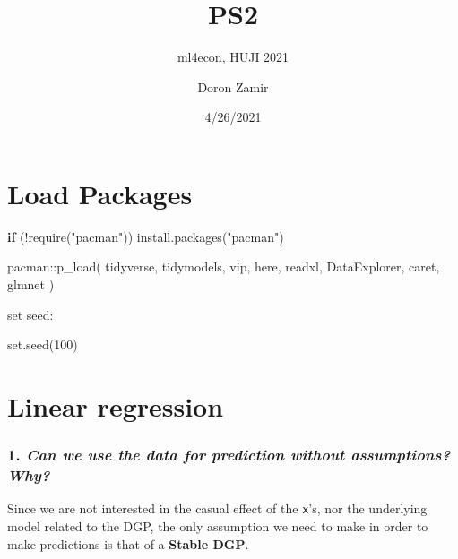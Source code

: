 \documentclass[
]{article}
\title{PS2}
\subtitle{ml4econ, HUJI 2021}
\author{Doron Zamir}
\date{4/26/2021}
\newenvironment{Shaded}{\begin{snugshade}}{\end{snugshade}}
\newcommand{\ControlFlowTok}[1]{\textcolor[rgb]{0.13,0.29,0.53}{\textbf{#1}}}
\newcommand{\DecValTok}[1]{\textcolor[rgb]{0.00,0.00,0.81}{#1}}
\newcommand{\FunctionTok}[1]{\textcolor[rgb]{0.00,0.00,0.00}{#1}}
\newcommand{\NormalTok}[1]{#1}
\newcommand{\SpecialCharTok}[1]{\textcolor[rgb]{0.00,0.00,0.00}{#1}}
\newcommand{\StringTok}[1]{\textcolor[rgb]{0.31,0.60,0.02}{#1}}
\begin{document}
\maketitle

\hypertarget{load-packages}{%
\section{Load Packages}\label{load-packages}}

\begin{Shaded}
\begin{Highlighting}[]
\ControlFlowTok{if}\NormalTok{ (}\SpecialCharTok{!}\FunctionTok{require}\NormalTok{(}\StringTok{"pacman"}\NormalTok{)) }\FunctionTok{install.packages}\NormalTok{(}\StringTok{"pacman"}\NormalTok{)}

\NormalTok{pacman}\SpecialCharTok{::}\FunctionTok{p\_load}\NormalTok{(}
\NormalTok{  tidyverse,}
\NormalTok{  tidymodels,}
\NormalTok{  vip,}
\NormalTok{  here,}
\NormalTok{  readxl,}
\NormalTok{  DataExplorer,}
\NormalTok{  caret,}
\NormalTok{  glmnet}
\NormalTok{)}
\end{Highlighting}
\end{Shaded}

set seed:

\begin{Shaded}
\begin{Highlighting}[]
\FunctionTok{set.seed}\NormalTok{(}\DecValTok{100}\NormalTok{)}
\end{Highlighting}
\end{Shaded}

\hypertarget{linear-regression}{%
\section{Linear regression}\label{linear-regression}}

\hypertarget{can-we-use-the-data-for-prediction-without-assumptions-why}{%
\subsubsection{\texorpdfstring{1. \emph{Can we use the data for
prediction without assumptions?
Why?}}{1. Can we use the data for prediction without assumptions? Why?}}\label{can-we-use-the-data-for-prediction-without-assumptions-why}}

Since we are not interested in the casual effect of the \texttt{x}'s,
nor the underlying model related to the DGP, the only assumption we need
to make in order to make predictions is that of a \textbf{Stable DGP}.
\end{document}
